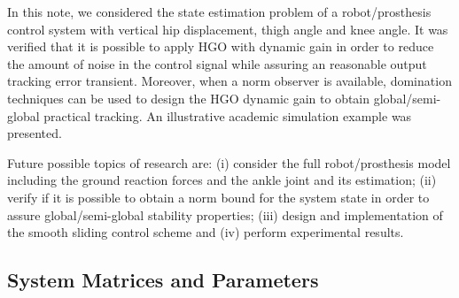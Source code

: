 \documentclass[letterpaper, 10 pt, journal, twocolumn]{IEEEtran}  %
\theoremstyle{plain}
\theoremstyle{definition}
\theoremstyle{remark}
\begin{document}
In this note, we considered the state estimation problem of a robot/prosthesis control system with vertical hip displacement, thigh angle and knee angle.  It was verified that it is possible to apply HGO with dynamic gain in order to reduce the amount of noise in the control signal while assuring an reasonable output tracking error transient. Moreover, when a norm observer is available, domination techniques can be used to design the HGO dynamic gain to obtain global/semi-global practical tracking. An illustrative academic simulation example was presented.


Future possible topics of research are: (i) consider the full robot/prosthesis model including the ground reaction forces and the ankle joint and its estimation; (ii) verify if it is possible to obtain a norm bound for the system state in order to assure global/semi-global stability properties; (iii) design and implementation of the smooth sliding control scheme and (iv) perform experimental results.

\begin{footnotesize}
\end{footnotesize}
 
%
%
%
%



\appendix


\subsection{System Matrices and Parameters}\label{ap:system}
\end{document}
